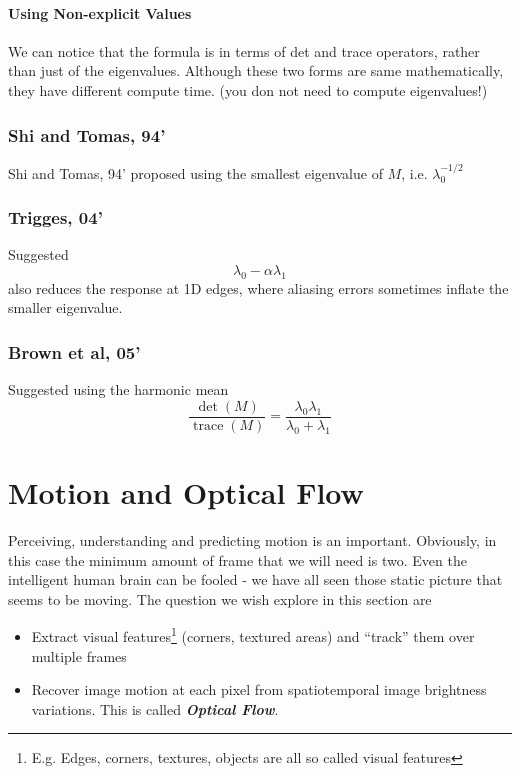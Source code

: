 \documentclass[11pt]{article}
\begin{document}
\paragraph{Using Non-explicit Values} We can notice that the formula is in terms of det and trace operators, rather than just of the eigenvalues. Although these two forms are same mathematically, they have different compute time. (you don not need to compute eigenvalues!)

\subsubsection{Shi and Tomas, 94'}
Shi and Tomas, 94' proposed using the smallest eigenvalue of $M$, i.e. $\lambda_0^{-1/2}$

\subsubsection{Trigges, 04'}
Suggested 
\begin{equation}
	\lambda_0 - \alpha \lambda_1
\end{equation}
also reduces the response at 1D edges, where aliasing errors sometimes inflate the smaller eigenvalue. 

\subsubsection{Brown et al, 05'}
Suggested using the harmonic mean
\begin{equation}
	\frac{\operatorname{det}(M)}{\operatorname{trace}(M)}=\frac{\lambda_{0} \lambda_{1}}{\lambda_{0}+\lambda_{1}}
\end{equation}

\section{Motion and Optical Flow}
Perceiving, understanding and predicting motion is an important. Obviously, in this case the minimum amount of frame that we will need is two. Even the intelligent human brain can be fooled - we have all seen those static picture that seems to be moving. The question we wish explore in this section are
\begin{itemize}
	\item Extract visual features\footnote{E.g. Edges, corners, textures, objects are all so called visual features} (corners, textured areas) and ``track'' them over multiple frames
	\item Recover image motion at each pixel from spatiotemporal image brightness variations. This is called \textit{\textbf{Optical Flow}}.
\end{itemize}
 
\end{document}
